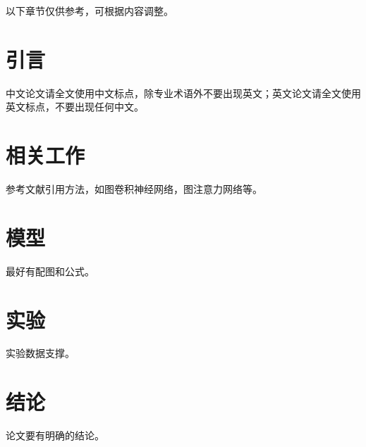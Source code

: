 \documentclass[conference]{IEEEtran}
\begin{document}
以下章节仅供参考，可根据内容调整。

\section{引言}

中文论文请全文使用中文标点，除专业术语外不要出现英文；英文论文请全文使用英文标点，不要出现任何中文。

\section{相关工作}

参考文献引用方法，如图卷积神经网络\cite{kipf2017semi}，图注意力网络\cite{velivckovic2018graph}等。

\section{模型}

最好有配图和公式。

\section{实验}

实验数据支撑。

\section{结论}

论文要有明确的结论。



\end{document}
